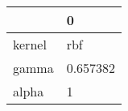 \begin{tabular}{ll}
\toprule
{} &         0 \\
\midrule
kernel &       rbf \\
gamma  &  0.657382 \\
alpha  &         1 \\
\bottomrule
\end{tabular}
